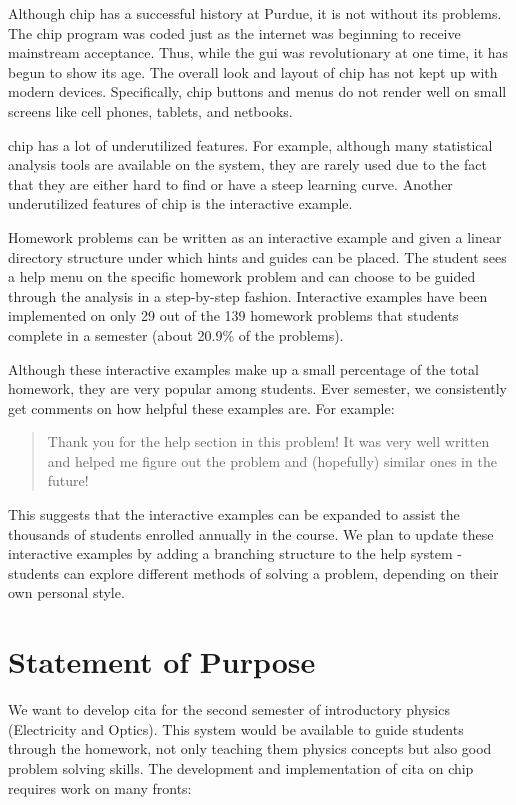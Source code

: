 Although \gls{chip} has a successful history at Purdue, it is not without its problems. The \gls{chip} program was coded just as the internet was beginning to receive mainstream acceptance. Thus, while the \gls{gui} was revolutionary at one time, it has begun to show its age. The overall look and layout of \gls{chip} has not kept up with modern devices. Specifically, \gls{chip} buttons and menus do not render well on small screens like cell phones, tablets, and netbooks.

\gls{chip} has a lot of underutilized features. For example, although many statistical analysis tools are available on the system, they are rarely used due to the fact that they are either hard to find or have a steep learning curve. Another underutilized features of \gls{chip} is the interactive example.

Homework problems can be written as an interactive example and given a linear directory structure under which hints and guides can be placed. The student sees a help menu on the specific homework problem and can choose to be guided through the analysis in a step-by-step fashion. Interactive examples have been implemented on only 29 out of the 139 homework problems that students complete in a semester (about 20.9\% of the problems).

Although these interactive examples make up a small percentage of the total homework, they are very popular among students. Ever semester, we consistently get comments on how helpful these examples are. For example:

\begin{quotation}
Thank you for the help section in this problem! It was very well written and helped me figure out the problem and (hopefully) similar ones in the future!
\end{quotation}

This suggests that the interactive examples can be expanded to assist the thousands of students enrolled annually in the course. We plan to update these interactive examples by adding a branching structure to the help system - students can explore different methods of solving a problem, depending on their own personal style.

\section{Statement of Purpose}

We want to develop \gls{cita} for the second semester of introductory physics (Electricity and Optics). This system would be available to guide students through the homework, not only teaching them physics concepts but also good problem solving skills. The development and implementation of \gls{cita} on \gls{chip} requires work on many fronts:

